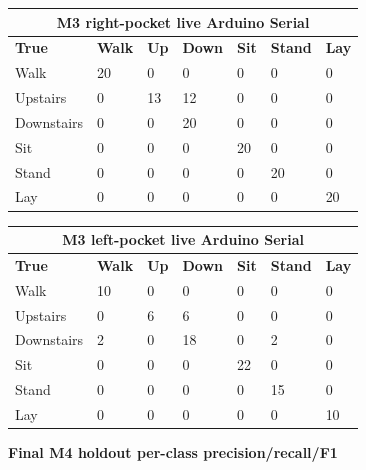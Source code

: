 \documentclass[11pt,a4paper]{article}
\begin{document}
\begin{center}
\scriptsize
\begin{tabular}{|p{2.2cm}|p{1.0cm}|p{1.0cm}|p{1.0cm}|p{1.0cm}|p{1.0cm}|p{1.0cm}|}
\hline
\multicolumn{7}{|c|}{\cellcolor{headergray}\textbf{M3 right-pocket live Arduino Serial}}\\
\hline
\rowcolor{headergray}
\textbf{True} & \textbf{Walk} & \textbf{Up} & \textbf{Down} & \textbf{Sit} & \textbf{Stand} & \textbf{Lay}\\
\hline
Walk & 20 & 0 & 0 & 0 & 0 & 0\\
\hline
Upstairs & 0 & 13 & 12 & 0 & 0 & 0\\
\hline
Downstairs & 0 & 0 & 20 & 0 & 0 & 0\\
\hline
Sit & 0 & 0 & 0 & 20 & 0 & 0\\
\hline
Stand & 0 & 0 & 0 & 0 & 20 & 0\\
\hline
Lay & 0 & 0 & 0 & 0 & 0 & 20\\
\hline
\end{tabular}
\end{center}
\normalsize

\begin{center}
\scriptsize
\begin{tabular}{|p{2.2cm}|p{1.0cm}|p{1.0cm}|p{1.0cm}|p{1.0cm}|p{1.0cm}|p{1.0cm}|}
\hline
\multicolumn{7}{|c|}{\cellcolor{headergray}\textbf{M3 left-pocket live Arduino Serial}}\\
\hline
\rowcolor{headergray}
\textbf{True} & \textbf{Walk} & \textbf{Up} & \textbf{Down} & \textbf{Sit} & \textbf{Stand} & \textbf{Lay}\\
\hline
Walk & 10 & 0 & 0 & 0 & 0 & 0\\
\hline
Upstairs & 0 & 6 & 6 & 0 & 0 & 0\\
\hline
Downstairs & 2 & 0 & 18 & 0 & 2 & 0\\
\hline
Sit & 0 & 0 & 0 & 22 & 0 & 0\\
\hline
Stand & 0 & 0 & 0 & 0 & 15 & 0\\
\hline
Lay & 0 & 0 & 0 & 0 & 0 & 10\\
\hline
\end{tabular}
\end{center}
\normalsize

\textbf{Final M4 holdout per-class precision/recall/F1}
\end{document}
